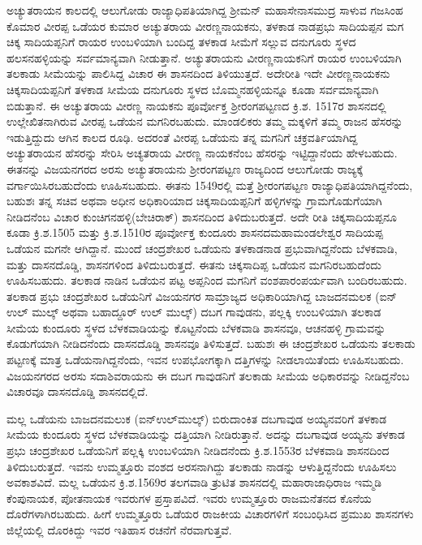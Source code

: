ಅಚ್ಯುತರಾಯನ ಕಾಲದಲ್ಲಿ ಆಲುಗೋಡು ರಾಜ್ಯಾಧಿಪತಿಯಾಗಿದ್ದ ಶ‍್ರೀಮನ್​ ಮಹಾಸೇನಾಸಮುದ್ರ ಸಾಳುವ ಗಜಸಿಂಹ ಕೊಮಾರ ವೀರಪ್ಪ ಒಡೆಯರ ಕುಮಾರ ಅಚ್ಯುತರಾಯ ವೀರಣ್ಣನಾಯಕನು, ತಳಕಾಡ ನಾಡಪ್ರಭು ಸಾದಿಯಪ್ಪನ ಮಗ ಚಿಕ್ಕ ಸಾದಿಯಪ್ಪನಿಗೆ ರಾಯರ ಉಂಬಳಿಯಾಗಿ ಬಂದಿದ್ದ ತಳಕಾಡ ಸೀಮೆಗೆ ಸಲ್ಲುವ ದನುಗೂರು ಸ್ಥಳದ ಹಲಸನಹಳ್ಳಿಯನ್ನು ಸರ್ವಮಾನ್ಯವಾಗಿ ನೀಡುತ್ತಾನೆ. ಅಚ್ಯುತರಾಯನು ವೀರಣ್ಣನಾಯಕನಿಗೆ ರಾಯರ ಉಂಬಳಿಯಾಗಿ ತಲಕಾಡು ಸೀಮೆಯನ್ನು ಪಾಲಿಸಿದ್ದ ವಿಚಾರ ಈ ಶಾಸನದಿಂದ ತಿಳಿಯುತ್ತದೆ. ಅದೇರೀತಿ ಇದೇ ವೀರಣ್ಣನಾಯಕನು ಚಿಕ್ಕಸಾದಿಯಪ್ಪನಿಗೆ ತಳಕಾಡ ಸೀಮೆಯ ದನುಗೂರು ಸ್ಥಳದ ಬೊಮ್ಮನಹಳ್ಳಿಯನ್ನೂ ಕೂಡಾ ಸರ್ವಮಾನ್ಯವಾಗಿ ಬಿಡುತ್ತಾನೆ. ಈ ಅಚ್ಯುತರಾಯ ವೀರಣ್ಣ ನಾಯಕನು ಪೂರ್ವೋಕ್ತ ಶ‍್ರೀರಂಗಪಟ್ಟಣದ ಕ್ರಿ.ಶ. 1517ರ ಶಾಸನದಲ್ಲಿ ಉಲ್ಲೇಖಿತನಾಗಿರುವ ವೀರಪ್ಪ ಒಡೆಯನ ಮಗನಿರಬಹುದು. ಮಾಂಡಲಿಕರು ತಮ್ಮ ಮಕ್ಕಳಿಗೆ ತಮ್ಮ ರಾಜನ ಹೆಸರನ್ನು ಇಡುತ್ತಿದ್ದುದು ಆಗಿನ ಕಾಲದ ರೂಢಿ. ಅದರಂತೆ ವೀರಪ್ಪ ಒಡೆಯನು ತನ್ನ ಮಗನಿಗೆ ಚಕ್ರವರ್ತಿಯಾಗಿದ್ದ ಅಚ್ಯುತರಾಯನ ಹೆಸರನ್ನು ಸೇರಿಸಿ ಅಚ್ಯತರಾಯ ವೀರಣ್ಣ ನಾಯಕನೆಂಬ ಹೆಸರನ್ನು ಇಟ್ಟಿದ್ದಾನೆಂದು ಹೇಳಬಹುದು. ಈತನನ್ನು ವಿಜಯನಗರದ ಅರಸು ಅಚ್ಯುತರಾಯನು ಶ‍್ರೀರಂಗಪಟ್ಟಣ ರಾಜ್ಯದಿಂದ ಆಲುಗೋಡು ರಾಜ್ಯಕ್ಕೆ ವರ್ಗಾಯಿಸಿರಬಹುದೆಂದು ಊಹಿಸಬಹುದು. ಈತನು 1549ರಲ್ಲಿ ಮತ್ತೆ ಶ‍್ರೀರಂಗಪಟ್ಟಣ ರಾಜ್ಯಾಧಿಪತಿಯಾಗಿದ್ದನೆಂದು, ಬಹುಶಃ ತನ್ನ ಸಚಿವ ಅಥವಾ ಅಧೀನ ಅಧಿಕಾರಿಯಾದ ಚಿಕ್ಕಸಾದಿಯಪ್ಪ\-ನಿಗೆ ಹಳ್ಳಿಗಳನ್ನು ಗ್ರಾಮಗೊಡುಗೆಯಾಗಿ ನೀಡಿದನೆಂಬ ವಿಚಾರ ಕುಂಚಿಗನಹಳ್ಳಿ(ಬೇಚಿರಾಕ್​) ಶಾಸನದಿಂದ ತಿಳಿದುಬರುತ್ತದೆ. ಅದೇ ರೀತಿ ಚಿಕ್ಕಸಾದಿಯಪ್ಪನೂ ಕೂಡಾ ಕ್ರಿ.ಶ.1505 ಮತ್ತು ಕ್ರಿ.ಶ.1510ರ ಪೂರ್ವೋಕ್ತ ಕುಂದೂರು ಶಾಸನದ\break ಮಹಾಮಂಡಲೇಶ್ವರ ಸಾದಿಯಪ್ಪ ಒಡೆಯನ ಮಗನೇ ಆಗಿದ್ದಾನೆ. ಮುಂದೆ ಚಂದ್ರಶೇಖರ ಒಡೆಯನು ತಳಕಾಡನಾಡ ಪ್ರಭುವಾಗಿದ್ದನೆಂದು ಬೆಳಕವಾಡಿ, ಮತ್ತು ದಾಸನದೊಡ್ಡಿ, ಶಾಸನಗಳಿಂದ ತಿಳಿದುಬರುತ್ತದೆ. ಈತನು ಚಿಕ್ಕಸಾದಿಪ್ಪ ಒಡೆಯನ ಮಗನಿರಬಹುದೆಂದು ಊಹಿಸಬಹುದು. ತಲಕಾಡ ನಾಡಿನ ಒಡೆಯನ ಪಟ್ಟ ಅಪ್ಪನಿಂದ ಮಗನಿಗೆ ವಂಶ\-ಪಾರಂಪರ್ಯವಾಗಿ ಬಂದಿರಬಹುದು. ತಲಕಾಡ ಪ್ರಭು ಚಂದ್ರಶೇಖರ ಒಡೆಯನಿಗೆ ವಿಜಯನಗರ ಸಾಮ್ರಾಜ್ಯದ ಅಧಿಕಾರಿಯಾಗಿದ್ದ ಬಾಜದನಮಲಕ (ಐನ್​ ಉಲ್​ ಮುಲ್ಕ್​ ಅಥವಾ ಬಹಾದ್ದೂರ್ ಉಲ್​ ಮುಲ್ಕ್​) ದಬಗ ಗಾವುಡನು, ಪಲ್ಲಕ್ಕಿ ಉಂಬಳಿಯಾಗಿ ತಲಕಾಡ ಸೀಮೆಯ ಕುಂದೂರು ಸ್ಥಳದ ಬೆಳಕವಾಡಿಯನ್ನು ಕೊಟ್ಟನೆಂದು ಬೆಳಕವಾಡಿ ಶಾಸನವೂ, ಆಚನಹಳ್ಳಿ ಗ್ರಾಮವನ್ನು ಕೊಡುಗೆಯಾಗಿ ನೀಡಿದನೆಂದು ದಾಸನದೊಡ್ಡಿ ಶಾಸನವೂ ತಿಳಿಸುತ್ತದೆ. ಬಹುಶಃ ಈ ಚಂದ್ರಶೇಖರ ಒಡೆಯನು ತಲಕಾಡು ಪಟ್ಟಣಕ್ಕೆ ಮಾತ್ರ ಒಡೆಯನಾಗಿದ್ದನೆಂದು, ಇವನ ಉಪಭೋಗಕ್ಕಾಗಿ ದತ್ತಿಗಳನ್ನು ನೀಡಲಾಯಿತೆಂದು ಊಹಿಸಬಹುದು. ವಿಜಯನಗರದ ಅರಸು ಸದಾಶಿವರಾಯನು ಈ ದಬಗ ಗಾವುಡನಿಗೆ ತಲಕಾಡು ಸೀಮೆಯ ಅಧಿಕಾರವನ್ನು ನೀಡಿದ್ದನೆಂಬ ವಿಚಾರವೂ ದಾಸನದೊಡ್ಡಿ ಶಾಸನದಲ್ಲಿದೆ.

ಮಲ್ಲ ಒಡೆಯನು ಬಾಜದನಮಲುಕ (ಐನ್​\enginline{-}ಉಲ್​\enginline{-}ಮುಲ್ಕ್​) ಬಿರುದಾಂಕಿತ ದಬಗಾವುಡ ಅಯ್ಯನವರಿಗೆ ತಳಕಾಡ ಸೀಮೆಯ ಕುಂದೂರು ಸ್ಥಳದ ಬೆಳಕವಾಡಿಯನ್ನು ದತ್ತಿಯಾಗಿ ನೀಡಿರುತ್ತಾನೆ. ಅದನ್ನು ದಬಗಾವುಡ ಅಯ್ಯನು ತಳಕಾಡ ಪ್ರಭು ಚಂದ್ರಶೇಖರ ಒಡೆಯನಿಗೆ ಪಲ್ಲಕ್ಕಿ ಉಂಬಳಿಯಾಗಿ ನೀಡಿದನೆಂದು ಕ್ರಿ.ಶ.1553ರ ಬೆಳಕವಾಡಿ ಶಾಸನದಿಂದ ತಿಳಿದುಬರುತ್ತದೆ. ಇವನು ಉಮ್ಮತ್ತೂರು ವಂಶದ ಅರಸನಾಗಿದ್ದು ತಲಕಾಡು ನಾಡನ್ನು ಆಳುತ್ತಿದ್ದನೆಂದು ಊಹಿಸಲು ಅವಕಾಶವಿದೆ. ಮಲ್ಲ ಒಡೆಯನ ಕ್ರಿ.ಶ.1569ರ ತಲಗವಾಡಿ ತ್ರುಟಿತ ಶಾಸನದಲ್ಲಿ ಮಹಾರಾಜಾಧಿರಾಜ ಇಮ್ಮಡಿ ಕೆಂಪುನಾಯಕ, ಪೋತನಾಯಕ ಇವರುಗಳ ಪ್ರಸ್ತಾಪವಿದೆ. ಇವರು ಉಮ್ಮತ್ತೂರು ರಾಜಮನೆತನದ ಕೊನೆಯ ದೊರೆಗಳಾಗಿರಬಹುದು. ಹೀಗೆ ಉಮ್ಮತ್ತೂರು ಒಡೆಯರ ರಾಜಕೀಯ ವಿಚಾರಗಳಿಗೆ ಸಂಬಂಧಿಸಿದ ಪ್ರಮುಖ ಶಾಸನಗಳು ಜಿಲ್ಲೆಯಲ್ಲಿ ದೊರಕಿದ್ದು ಇವರ ಇತಿಹಾಸ ರಚನೆಗೆ ನೆರವಾಗುತ್ತವೆ.


